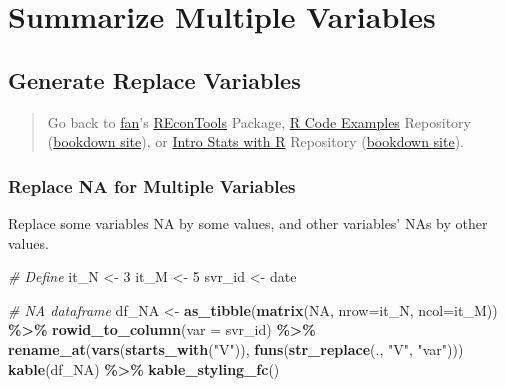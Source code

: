 \documentclass[
]{book}
\newenvironment{Shaded}{\begin{snugshade}}{\end{snugshade}}
\newcommand{\CommentTok}[1]{\textcolor[rgb]{0.56,0.35,0.01}{\textit{#1}}}
\newcommand{\DataTypeTok}[1]{\textcolor[rgb]{0.13,0.29,0.53}{#1}}
\newcommand{\DecValTok}[1]{\textcolor[rgb]{0.00,0.00,0.81}{#1}}
\newcommand{\KeywordTok}[1]{\textcolor[rgb]{0.13,0.29,0.53}{\textbf{#1}}}
\newcommand{\NormalTok}[1]{#1}
\newcommand{\OperatorTok}[1]{\textcolor[rgb]{0.81,0.36,0.00}{\textbf{#1}}}
\newcommand{\OtherTok}[1]{\textcolor[rgb]{0.56,0.35,0.01}{#1}}
\newcommand{\StringTok}[1]{\textcolor[rgb]{0.31,0.60,0.02}{#1}}
\begin{document}
\hypertarget{summarize-multiple-variables}{%
\section{Summarize Multiple Variables}\label{summarize-multiple-variables}}

\hypertarget{generate-replace-variables}{%
\subsection{Generate Replace Variables}\label{generate-replace-variables}}

\begin{quote}
Go back to \href{http://fanwangecon.github.io/}{fan}'s \href{https://fanwangecon.github.io/REconTools/}{REconTools} Package, \href{https://fanwangecon.github.io/R4Econ/}{R Code Examples} Repository (\href{https://fanwangecon.github.io/R4Econ/bookdown}{bookdown site}), or \href{https://fanwangecon.github.io/Stat4Econ/}{Intro Stats with R} Repository (\href{https://fanwangecon.github.io/Stat4Econ/bookdown}{bookdown site}).
\end{quote}

\hypertarget{replace-na-for-multiple-variables}{%
\subsubsection{Replace NA for Multiple Variables}\label{replace-na-for-multiple-variables}}

Replace some variables NA by some values, and other variables' NAs by other values.

\begin{Shaded}
\begin{Highlighting}[]
\CommentTok{\# Define}
\NormalTok{it\_N \textless{}{-}}\StringTok{ }\DecValTok{3}
\NormalTok{it\_M \textless{}{-}}\StringTok{ }\DecValTok{5}
\NormalTok{svr\_id \textless{}{-}}\StringTok{ \textquotesingle{}date\textquotesingle{}}

\CommentTok{\# NA dataframe}
\NormalTok{df\_NA \textless{}{-}}\StringTok{ }\KeywordTok{as\_tibble}\NormalTok{(}\KeywordTok{matrix}\NormalTok{(}\OtherTok{NA}\NormalTok{, }\DataTypeTok{nrow=}\NormalTok{it\_N, }\DataTypeTok{ncol=}\NormalTok{it\_M)) }\OperatorTok{\%\textgreater{}\%}
\StringTok{  }\KeywordTok{rowid\_to\_column}\NormalTok{(}\DataTypeTok{var =}\NormalTok{ svr\_id) }\OperatorTok{\%\textgreater{}\%}
\StringTok{  }\KeywordTok{rename\_at}\NormalTok{(}\KeywordTok{vars}\NormalTok{(}\KeywordTok{starts\_with}\NormalTok{(}\StringTok{"V"}\NormalTok{)),}
            \KeywordTok{funs}\NormalTok{(}\KeywordTok{str\_replace}\NormalTok{(., }\StringTok{"V"}\NormalTok{, }\StringTok{"var"}\NormalTok{)))}
\KeywordTok{kable}\NormalTok{(df\_NA) }\OperatorTok{\%\textgreater{}\%}
\StringTok{  }\KeywordTok{kable\_styling\_fc}\NormalTok{()}
\end{Highlighting}
\end{Shaded}
\end{document}
